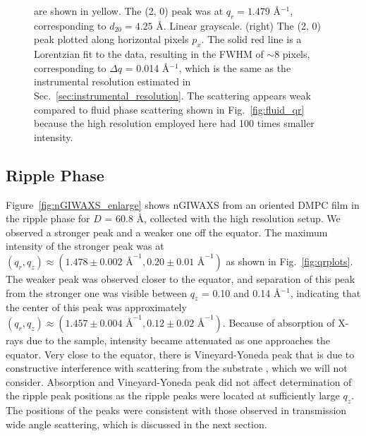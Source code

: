 \begin{figure}[htbp]
{  are shown in yellow. The (2, 0) peak was at
  $q_r=1.479$ \AA$^{-1}$, corresponding to $d_{20}=4.25$ \AA. Linear grayscale.
  (right) The (2, 0) peak plotted along horizontal pixels $p_x$. The solid red
  line is a Lorentzian fit to the data, resulting in the FWHM of $\sim$8 pixels,
  corresponding to $\Delta q$ = 0.014 \AA$^{-1}$,
  which is the same as the instrumental resolution 
  estimated in Sec.~\ref{sec:instrumental_resolution}.
  The scattering appears weak compared to fluid phase scattering shown in 
  Fig.~\ref{fig:fluid_qr} because the high resolution employed here had 100 
  times smaller intensity.}
  \label{fig:gel_phase}  
\end{figure}

\subsection{Ripple Phase}\label{sec:nGIWAXS_ripple_phase}
Figure~\ref{fig:nGIWAXS_enlarge} shows nGIWAXS from an oriented DMPC film
in the ripple phase for $D$ = 60.8 \AA, collected with the high resolution setup. 
We observed a stronger peak and a weaker one off the equator. 
The maximum intensity of the stronger peak was at 
$(q_r, q_z) \approx (1.478 \pm 0.002 \text{ \AA}^{-1}, 0.20 \pm 0.01 \text{ \AA}^{-1})$ as shown
in Fig.~\ref{fig:qrplots}. The weaker peak was observed closer to the equator, and
separation of this peak from the stronger one was visible between 
$q_z$ = 0.10 and 0.14 \AA$^{-1}$, indicating that the center of this peak was approximately
$(q_r, q_z) \approx (1.457 \pm 0.004 \text{ \AA}^{-1}, 0.12 \pm 0.02 \text{ \AA}^{-1})$. 
Because of absorption of X-rays due to the sample, 
intensity became attenuated as one approaches the equator.
Very close to the equator, there is Vineyard-Yoneda 
peak that is due to constructive interference with scattering from the substrate
\cite{ref:Vineyard82,ref:Miller08},
which we will not consider.
Absorption and Vineyard-Yoneda peak did not affect determination of the 
ripple peak positions
as the ripple peaks were located at sufficiently large $q_z$. 
The positions of the peaks were consistent with those observed in 
transmission wide angle scattering, which is discussed in the next section.

